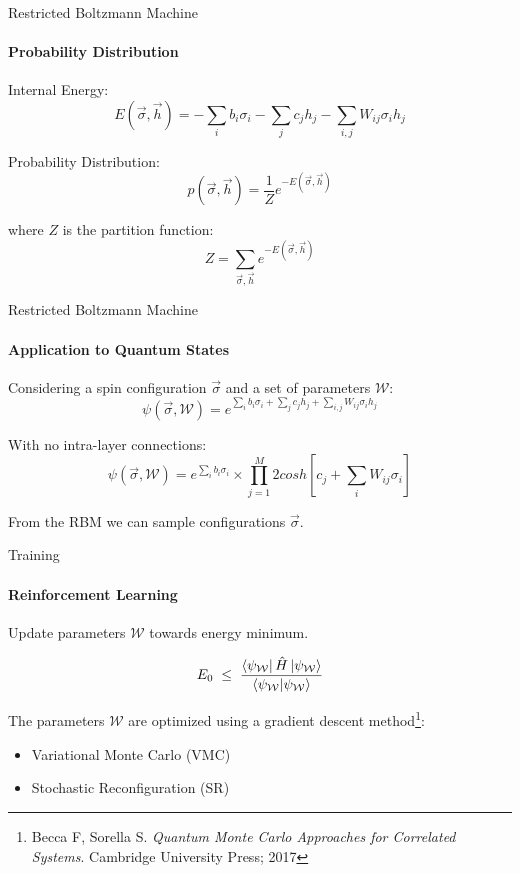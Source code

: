 \documentclass{beamer}
\begin{document}
\begin{frame}{Restricted Boltzmann Machine}
\framesubtitle{Probability Distribution}
Internal Energy:
$$E(\vec{\sigma}, \vec{h}) = -\sum_{i} b_i \sigma_i - \sum_{j} c_j h_j - \sum_{i,j} W_{ij} \sigma_i h_j$$

Probability Distribution:
$$p(\vec{\sigma}, \vec{h}) = \frac{1}{Z} e^{-E(\vec{\sigma}, \vec{h})}$$

where $Z$ is the partition function:
$$Z = \sum_{\vec{\sigma}, \vec{h}} e^{-E(\vec{\sigma}, \vec{h})}$$
\end{frame}

\begin{frame}{Restricted Boltzmann Machine}
\framesubtitle{Application to Quantum States}
Considering a spin configuration $\vec{\sigma}$ and a set of parameters $\mathcal{W}$:
$$\psi\left( \vec{\sigma}, \mathcal{W} \right) = e^{\sum_{i} b_i \sigma_i + \sum_{j} c_j h_j + \sum_{i,j} W_{ij} \sigma_i h_j}$$

With no intra-layer connections:
$$\psi\left( \vec{\sigma}, \mathcal{W} \right) = e^{\sum_{i} b_i \sigma_i} \times \prod_{j=1}^{M} {2 cosh\left[c_j + \sum_{i} W_{ij} \sigma_i\right]}$$

From the RBM we can sample configurations $\vec{\sigma}$.

\end{frame}

\begin{frame}{Training}
\framesubtitle{Reinforcement Learning}
Update parameters $\mathcal{W}$ towards energy minimum.

$$
E_0 \;\le\;
\frac{\bra{\psi_{\mathcal{W}}} \hat H \ket{\psi_{\mathcal{W}}} }
	{\bra{\psi_{\mathcal{W}}} \ket{\psi_{\mathcal{W}}}}
$$
\baselineskip

The parameters $\mathcal{W}$ are optimized using a gradient descent method\footnote{Becca F, Sorella S. \textit{Quantum Monte Carlo Approaches for Correlated Systems}. Cambridge University Press; 2017}:
\begin{itemize}
	\item Variational Monte Carlo (VMC)
	\item Stochastic Reconfiguration (SR)
\end{itemize}

\end{frame}
\end{document}
